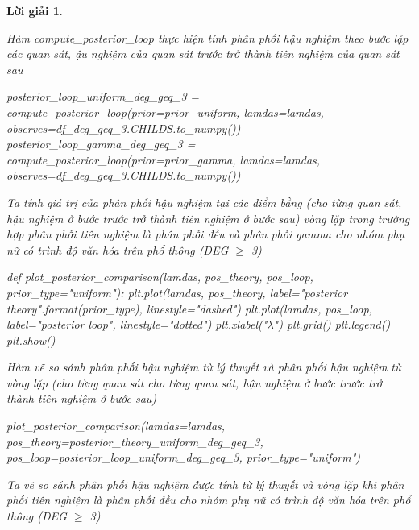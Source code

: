 \documentclass[14pt, a4paper]{article}
\theoremstyle{sltheorem}
\theoremstyle{soltheorem}
\newtheorem*{loigiai}{Lời giải}
\begin{document}
\begin{loigiai}
\begin{enumerate}
        Hàm compute\_posterior\_loop thực hiện tính phân phối hậu nghiệm theo bước lặp các quan sát, ậu nghiệm của quan sát trước trở thành tiên nghiệm của quan sát sau

        \begin{python}
posterior_loop_uniform_deg_geq_3 = compute_posterior_loop(prior=prior_uniform, lamdas=lamdas, observes=df_deg_geq_3.CHILDS.to_numpy())
posterior_loop_gamma_deg_geq_3 = compute_posterior_loop(prior=prior_gamma, lamdas=lamdas, observes=df_deg_geq_3.CHILDS.to_numpy())
        \end{python}
        Ta tính giá trị của phân phối hậu nghiệm tại các điểm bằng (cho từng quan sát, hậu nghiệm ở bước trước trở thành tiên nghiệm ở bước sau) vòng lặp trong trường hợp phân phối tiên nghiệm là phân phối đều và phân phối gamma cho nhóm phụ nữ có trình độ văn hóa trên phổ thông (DEG $\geq$ 3)

        \begin{python}
def plot_posterior_comparison(lamdas, pos_theory, pos_loop, prior_type="uniform"):
    plt.plot(lamdas, pos_theory, label="posterior {} theory".format(prior_type), linestyle="dashed")
    plt.plot(lamdas, pos_loop, label="posterior loop", linestyle="dotted")
    plt.xlabel("$\lambda$")
    plt.grid()
    plt.legend()
    plt.show()
        \end{python}

        Hàm vẽ so sánh phân phối hậu nghiệm từ lý thuyết và phân phối hậu nghiệm từ vòng lặp (cho từng quan sát cho từng quan sát, hậu nghiệm ở bước trước trở thành tiên nghiệm ở bước sau)

        \begin{python}
plot_posterior_comparison(lamdas=lamdas, pos_theory=posterior_theory_uniform_deg_geq_3, pos_loop=posterior_loop_uniform_deg_geq_3, prior_type="uniform")
        \end{python}

        Ta vẽ so sánh phân phối hậu nghiệm được tính từ lý thuyết và vòng lặp khi phân phối tiên nghiệm là phân phối đều cho nhóm phụ nữ có trình độ văn hóa trên phổ thông (DEG $\geq$ 3)


\end{enumerate}
\end{loigiai}
\end{document}
